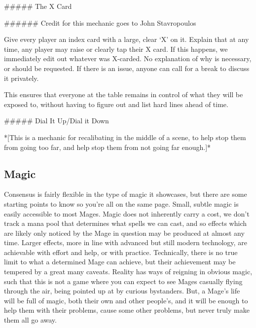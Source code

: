 \documentclass[
  oneside,
  statementpaper,
  9pt]{memoir}
\begin{document}
\begin{Narrator}

##### The X Card

###### Credit for this mechanic goes to John Stavropoulos

Give every player an index card with a large, clear ‘X’ on it. Explain that at any time, any player may raise or clearly tap their X card. If this happens, we immediately edit out whatever was X-carded. No explanation of why is necessary, or should be requested. If there is an issue, anyone can call for a break to discuss it privately.

This ensures that everyone at the table remains in control of what they will be exposed to, without having to figure out and list hard lines ahead of time.

##### Dial It Up/Dial it Down

*[This is a mechanic for recalibating in the middle of a scene, to help stop them from going too far, and help stop them from not going far enough.]*

\end{Narrator}

\hypertarget{magic-1}{%
\subsection{Magic}\label{magic-1}}

\begin{Narrator}

Consensus is fairly flexible in the type of magic it showcases, but there are some starting points to know so you’re all on the same page. Small, subtle magic is easily accessible to most Mages. Magic does not inherently carry a cost, we don’t track a mana pool that determines what spells we can cast, and so effects which are likely only noticed by the Mage in question may be produced at almost any time. Larger effects, more in line with advanced but still modern technology, are achievable with effort and help, or with practice. Technically, there is no true limit to what a determined Mage can achieve, but their achievement may be tempered by a great many caveats. Reality has ways of reigning in obvious magic, such that this is not a game where you can expect to see Mages casually flying through the air, being pointed up at by curious bystanders. But, a Mage’s life will be full of magic, both their own and other people’s, and it will be enough to help them with their problems, cause some other problems, but never truly make them all go away.

\end{Narrator}
\end{document}
